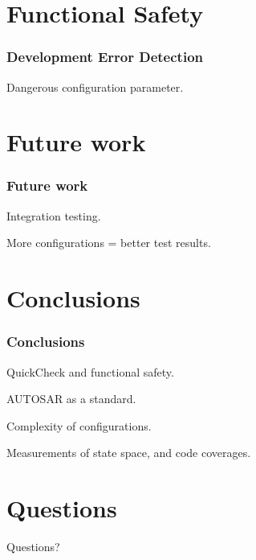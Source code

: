 \documentclass{beamer}
\begin{document}
\section{Functional Safety}
\begin{frame}[fragile]
  \frametitle{Development Error Detection}
  Dangerous configuration parameter.
\end{frame}

\section{Future work}
\begin{frame}[fragile]
  \frametitle{Future work}
  Integration testing.

  More configurations = better test results.
\end{frame}

\section{Conclusions}
\begin{frame}
  \frametitle{Conclusions}
  QuickCheck and functional safety.

  AUTOSAR as a standard.

  Complexity of configurations.

  Measurements of state space, and code coverages.
\end{frame}

\section{Questions}
\begin{frame}
  \Huge{\centerline{Questions?}}
\end{frame}
\end{document}
